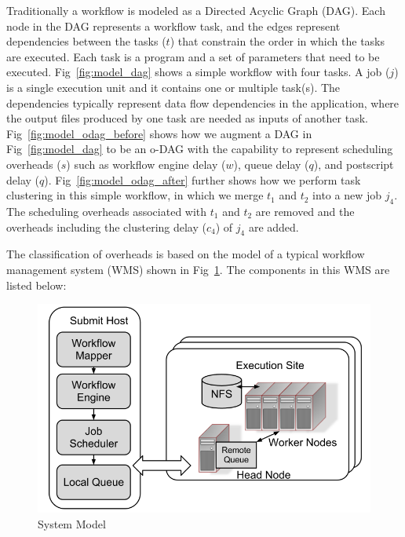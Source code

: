 Traditionally a workflow is modeled as a Directed Acyclic Graph (DAG). Each node in the DAG represents a workflow task, and the edges represent dependencies between the tasks ($t$) that constrain the order in which the tasks are executed. Each task is a program and a set of parameters that need to be executed. Fig~\ref{fig:model_dag} shows a simple workflow with four tasks. A job ($j$) is a single execution unit and it contains one or multiple task(s). The dependencies typically represent data flow dependencies in the application, where the output files produced by one task are needed as inputs of another task. 
Fig~\ref{fig:model_odag_before} shows how we augment a DAG in Fig~\ref{fig:model_dag} to be an o-DAG with the capability to represent scheduling overheads ($s$) such as workflow engine delay ($w$), queue delay ($q$), and postscript delay ($q$). Fig~\ref{fig:model_odag_after} further shows how we perform task clustering in this simple workflow, in which we merge $t_1$ and $t_2$ into a new job $j_4$. The scheduling overheads associated with $t_1$ and $t_2$ are removed and the overheads including the clustering delay ($c_4$) of $j_4$ are added. 







The classification of overheads is based on the model of a typical workflow management system (WMS) shown in Fig~\ref{fig:model_system}. The components in this WMS are listed below: 




\begin{figure}[h!]
\centering
  \includegraphics[width=0.6\linewidth]{figures/introduction/system.png}

  \caption{System Model}
  \label{fig:model_system}
\end{figure}


